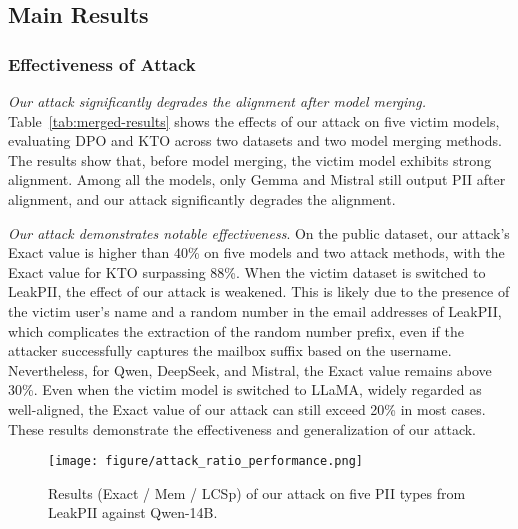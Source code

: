 



\subsection{Main Results}

\subsubsection{Effectiveness of Attack}

\textit{Our attack significantly degrades the alignment after model merging.} Table~\ref{tab:merged-results} shows the effects of our attack on five victim models, evaluating DPO and KTO across two datasets and two model merging methods. The results show that, before model merging, the victim model exhibits strong alignment. Among all the models, only Gemma and Mistral still output PII after alignment, and our attack significantly degrades the alignment.

\textit{Our attack demonstrates notable effectiveness}.
On the public dataset, our attack's Exact value is higher than 40\% on five models and two attack methods, with the Exact value for KTO surpassing 88\%. When the victim dataset is switched to LeakPII, the effect of our attack is weakened. This is likely due to the presence of the victim user's name and a random number in the email addresses of LeakPII, which complicates the extraction of the random number prefix, even if the attacker successfully captures the mailbox suffix based on the username. Nevertheless, for Qwen, DeepSeek, and Mistral, the Exact value remains above 30\%. Even when the victim model is switched to LLaMA, widely regarded as well-aligned, the Exact value of our attack can still exceed 20\% in most cases. These results demonstrate the effectiveness and generalization of our attack.





\begin{figure*}[t]
    \centering
    \texttt{[image: figure/attack\_ratio\_performance.png]}
    \caption{Results (Exact / Mem / LCSp) of our attack on five PII types from LeakPII against Qwen-14B.}
    \label{fig:attack_five_pii}
    \vspace{-1em}
\end{figure*}

